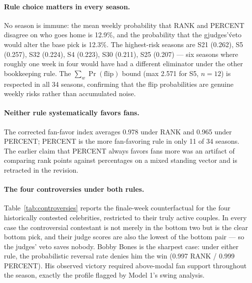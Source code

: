\documentclass[11pt]{article}
\begin{document}
\paragraph{Rule choice matters in every season.} No season is immune: the mean weekly probability
that RANK and PERCENT disagree on who goes home is 12.9\%, and the probability that the
gjudges'\' veto would alter the base pick is 12.3\%. The highest-risk seasons are S21 (0.262),
S5 (0.257), S32 (0.224), S4 (0.223), S30 (0.211), S25 (0.207) --- six seasons where roughly one
week in four would have had a different eliminator under the other bookkeeping rule. The
$\sum_w \Pr(\text{flip})$ bound (max 2.571 for S5, $n=12$) is respected in all 34 seasons,
confirming that the flip probabilities are genuine weekly risks rather than accumulated noise.

\paragraph{Neither rule systematically favors fans.} The corrected fan-favor index averages
0.978 under RANK and 0.965 under PERCENT; PERCENT is the more fan-favoring rule in only 11 of 34
seasons. The earlier claim that PERCENT always favors fans more was an artifact of comparing
rank points against percentages on a mixed standing vector and is retracted in the revision.

\paragraph{The four controversies under both rules.} Table~\ref{tab:controversies} reports the
finale-week counterfactual for the four historically contested celebrities, restricted to their
truly active couples. In every case the controversial contestant is not merely in the bottom two
but is the clear bottom pick, and their judge scores are also the lowest of the bottom pair --- so
the judges' veto saves nobody. Bobby Bones is the sharpest case: under either rule, the
probabilistic reversal rate denies him the win (0.997 RANK / 0.999 PERCENT). His observed
victory required above-modal fan support throughout the season, exactly the profile flagged by
Model 1's swing analysis.
\end{document}
